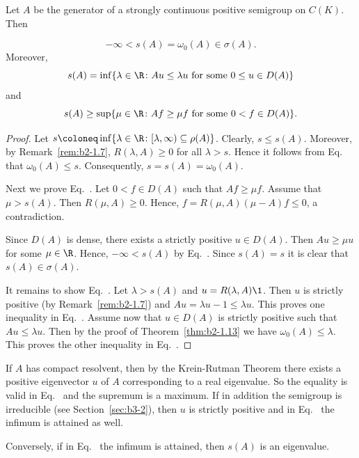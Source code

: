 \begin{corollary}\label{cor:b2-1.14}
Let $A$ be the generator of a strongly continuous positive semigroup on $C(K)$.
Then

\begin{equation}\label{eq:b2-1.7}
-\infty < s(A) = \omega_{0}(A) \in \sigma(A).
\end{equation}
Moreover,
\begin{equation}\label{eq:b2-1.8}
s(A) = \inf\{\lambda \in \R \colon Au \leq \lambda u \text{ for some } 0 \leq  u \in D(A)\}
\end{equation}
and
\begin{equation}\label{eq:b2-1.9}
s(A) \geq \sup\{\mu \in \R \colon Af \geq \mu f \text{ for some } 0 < f \in D(A)\}.
\end{equation}
\end{corollary}
\begin{proof}
Let $s \coloneq \inf\{\lambda \in \R \colon [\lambda,\infty) \subseteq \rho(A)\}$.
Clearly, $s \leq s(A)$.
Moreover, by Remark~\ref{rem:b2-1.7}, $R(\lambda,A) \geq 0$ for all $\lambda > s$.
Hence it follows from Eq.~ that $\omega_{0}(A) \leq s$.
Consequently, $s = s(A) = \omega_{0}(A)$.

Next we prove Eq.~.
Let $0 < f \in D(A)$ such that $Af \geq \mu f$.
Assume that $\mu > s(A)$.
Then $R(\mu,A) \geq 0$.
Hence, $f = R(\mu,A)(\mu-A)f \leq 0$, a contradiction.

Since $D(A)$ is dense, there exists a strictly positive $u \in D(A)$.
Then $Au \geq \mu u$ for some $\mu \in \R$.
Hence, $-\infty < s(A)$ by Eq.~. 
Since $s(A) = s$ it is clear that $s(A) \in \sigma(A)$.

It remains to show Eq.~. 
Let $\lambda > s(A)$ and $u = R(\lambda,A)\1$.
Then $u$ is strictly positive (by  Remark~\ref{rem:b2-1.7}) and $Au = \lambda u - 1 \leq \lambda u$.
This proves one inequality in Eq.~. 
Assume now that $u \in D(A)$ is strictly positive such that $Au \leq \lambda u$.
Then by the proof of Theorem~\ref{thm:b2-1.13} we have $\omega_{0}(A) \leq \lambda$.
This proves the other inequality in Eq.~. 
\end{proof}
\begin{remark}\label{rem:b2-1.15}
If\/ $A$ has compact resolvent, then by the Krein-Rutman Theorem there exists a positive eigenvector $u$ of\/ $A$ corresponding to a real eigenvalue.
So the equality is valid in Eq.~  
and the supremum is a maximum.
If in addition the semigroup is irreducible (see Section~\ref{sec:b3-2}), then $u$ is strictly positive and in Eq.~ 
the infimum is attained as well.

Conversely, if in Eq.~ 
the infimum is attained, then $s(A)$ is an eigenvalue.
\end{remark}

